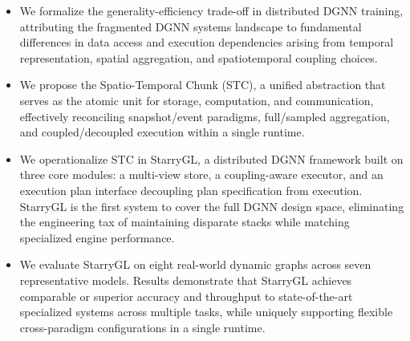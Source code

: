 \begin{itemize}
    \item We formalize the generality-efficiency trade-off in distributed DGNN training, attributing the fragmented DGNN systems landscape to fundamental differences in data access and execution dependencies arising from temporal representation, spatial aggregation, and spatiotemporal coupling choices.

    \item We propose the Spatio-Temporal Chunk (STC), a unified abstraction that serves as the atomic unit for storage, computation, and communication, effectively reconciling snapshot/event paradigms, full/sampled aggregation, and coupled/decoupled execution within a single runtime.

    \item We operationalize STC in StarryGL, a distributed DGNN framework built on three core modules: a multi-view store, a coupling-aware executor, and an execution plan interface decoupling plan specification from execution.
    StarryGL is the first system to cover the full DGNN design space, eliminating the engineering tax of maintaining disparate stacks while matching specialized engine performance.
 
     \item We evaluate StarryGL on eight real-world dynamic graphs across seven representative models. 
    Results demonstrate that StarryGL achieves comparable or superior accuracy and throughput to state-of-the-art specialized systems across multiple tasks, while uniquely supporting flexible cross-paradigm configurations in a single runtime.

\end{itemize}

